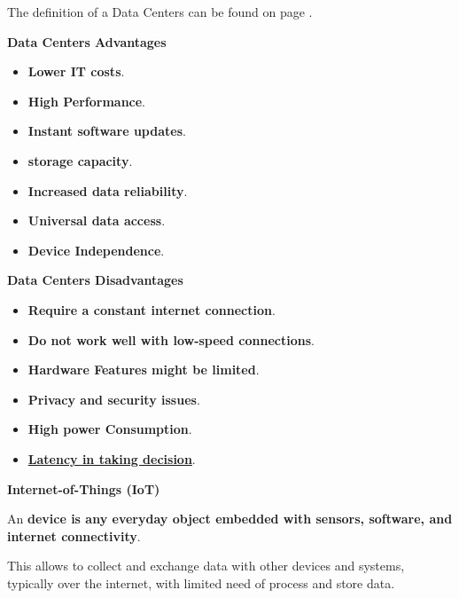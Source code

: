 \noindent
The definition of a Data Centers can be found on page \pageref{Data Center definition}.

\begin{flushleft}
    \textcolor{Green3}{ \textbf{Data Centers Advantages}}
\end{flushleft}
\begin{itemize}
    \item \textbf{Lower IT costs}.
    \item \textbf{High Performance}.
    \item \textbf{Instant software updates}.
    \item \textbf{ storage capacity}.
    \item \textbf{Increased data reliability}.
    \item \textbf{Universal data access}.
    \item \textbf{Device Independence}.
\end{itemize}

\begin{flushleft}
    \textcolor{Red2}{ \textbf{Data Centers Disadvantages}}
\end{flushleft}
\begin{itemize}
    \item \textbf{Require a constant internet connection}.
    \item \textbf{Do not work well with low-speed connections}.
    \item \textbf{Hardware Features might be limited}.
    \item \textbf{Privacy and security issues}.
    \item \textbf{High power Consumption}.
    \item \textbf{\underline{Latency in taking decision}}.
\end{itemize}

\newpage

\begin{center}
    \large
    \textcolor{Red3}{\textbf{Internet-of-Things (IoT)}}
\end{center}

\noindent
An  \textbf{device is any everyday object embedded with sensors, software, and internet connectivity}.

\highspace
This allows to collect and exchange data with other devices and systems, typically over the internet, with limited need of process and store data.

